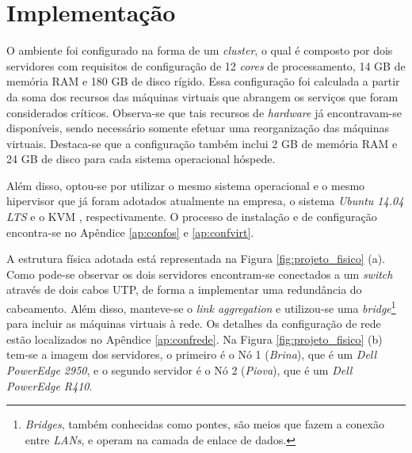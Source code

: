 \section{Implementação}
\label{section:implementacao}


O ambiente foi configurado na forma de um \textit{cluster}, o qual é composto por dois servidores com requisitos de configuração 
de 12 \textit{cores} de processamento, 14 GB de memória \ac{RAM} e 180 GB de disco rígido.
Essa configuração foi calculada a partir da soma dos recursos das máquinas virtuais que abrangem os serviços que foram considerados críticos. 
Observa-se que tais recursos de \textit{hardware} já encontravam-se disponíveis, sendo necessário somente efetuar uma reorganização 
das máquinas virtuais. Destaca-se que a configuração também inclui 2 GB de memória \ac{RAM} e 24 GB de disco para cada sistema operacional hóspede.

Além disso, optou-se por utilizar o mesmo sistema operacional e o mesmo hipervisor que já foram adotados atualmente na empresa, o sistema 
\textit{Ubuntu 14.04 \ac{LTS}} e o \ac{KVM} \cite{kvm}, respectivamente. O processo de instalação e de configuração encontra-se no 
Apêndice \ref{ap:confos} e \ref{ap:confvirt}.

A estrutura física adotada está representada na Figura \ref{fig:projeto_fisico} (a). Como pode-se observar os dois servidores encontram-se 
conectados a um \textit{switch} através de dois cabos UTP, de forma a implementar uma redundância do cabeamento. Além disso, manteve-se o 
\textit{link aggregation} e utilizou-se uma \textit{bridge}\footnote{\textit{Bridges}, também conhecidas como pontes, são meios que fazem a 
conexão entre \textit{LANs}, e operam na camada de enlace de dados.} para incluir as máquinas virtuais à rede. 
Os detalhes da configuração de rede estão localizados no Apêndice \ref{ap:confrede}.
Na Figura \ref{fig:projeto_fisico} (b) tem-se a imagem dos servidores, o primeiro é o Nó 1 (\textit{Brina}), que é um 
\textit{Dell PowerEdge 2950}, e o segundo servidor é o Nó 2 (\textit{Piova}), que é um \textit{Dell PowerEdge R410}.

